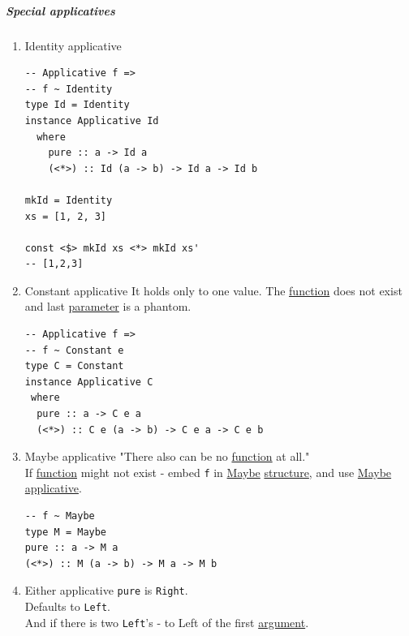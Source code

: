 \documentclass[11pt]{article}
\begin{document}
\subparagraph{\label{org2ce65ff}Special applicatives}
\label{sec:orgda3a69c}
\begin{enumerate}
\item \label{org7f79263}Identity applicative
\label{sec:orgdd3e139}
\begin{verbatim}
-- Applicative f =>
-- f ~ Identity
type Id = Identity
instance Applicative Id
  where
    pure :: a -> Id a
    (<*>) :: Id (a -> b) -> Id a -> Id b

mkId = Identity
xs = [1, 2, 3]

const <$> mkId xs <*> mkId xs'
-- [1,2,3]
\end{verbatim}

\item \label{org208fd88}Constant applicative
\label{sec:org261b26f}
It holds only to one value. The \hyperref[orgeb5cddb]{function} does not exist and last \hyperref[org45d4a16]{parameter} is a phantom.\\
\begin{verbatim}
-- Applicative f =>
-- f ~ Constant e
type C = Constant
instance Applicative C
 where
  pure :: a -> C e a
  (<*>) :: C e (a -> b) -> C e a -> C e b
\end{verbatim}

\item \label{org02f0214}Maybe applicative
\label{sec:org3577627}
"There also can be no \hyperref[orgeb5cddb]{function} at all."\\

If \hyperref[orgeb5cddb]{function} might not exist - embed \texttt{f} in \hyperref[orga420584]{Maybe} \hyperref[org93ee82c]{structure}, and use \hyperref[orga420584]{Maybe} \hyperref[org24a6930]{applicative}.\\
\begin{verbatim}
-- f ~ Maybe
type M = Maybe
pure :: a -> M a
(<*>) :: M (a -> b) -> M a -> M b
\end{verbatim}

\item \label{orgac7b99b}Either applicative
\label{sec:orgd0f536b}
\texttt{pure} is \texttt{Right}.\\
Defaults to \texttt{Left}.\\
And if there is two \texttt{Left}'s - to Left of the first \hyperref[orgf66a5f7]{argument}.\\


\end{enumerate}
\end{document}
